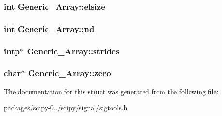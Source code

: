 \subsubsection[{elsize}]{\setlength{\rightskip}{0pt plus 5cm}int Generic\+\_\+\+Array\+::elsize}\label{structGeneric__Array_a64232de3a28523eb62cc8caef59339c8}
\hypertarget{structGeneric__Array_a5f2627cb8a3a968cf9a06bb0af53ebe3}{}
\subsubsection[{nd}]{\setlength{\rightskip}{0pt plus 5cm}int Generic\+\_\+\+Array\+::nd}\label{structGeneric__Array_a5f2627cb8a3a968cf9a06bb0af53ebe3}
\hypertarget{structGeneric__Array_a1b1579ba03f4f63c37f91d14909a8204}{}
\subsubsection[{strides}]{\setlength{\rightskip}{0pt plus 5cm}intp$\ast$ Generic\+\_\+\+Array\+::strides}\label{structGeneric__Array_a1b1579ba03f4f63c37f91d14909a8204}
\hypertarget{structGeneric__Array_aa70df67bcea3a7522111531684ba544c}{}
\subsubsection[{zero}]{\setlength{\rightskip}{0pt plus 5cm}char$\ast$ Generic\+\_\+\+Array\+::zero}\label{structGeneric__Array_aa70df67bcea3a7522111531684ba544c}


The documentation for this struct was generated from the following file\+:\begin{DoxyCompactItemize}
\item 
packages/scipy-\/0../scipy/signal/\hyperlink{sigtools_8h}{sigtools.\+h}\end{DoxyCompactItemize}
